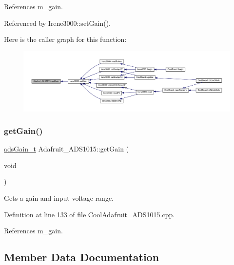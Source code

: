 References m\+\_\+gain.



Referenced by Irene3000\+::set\+Gain().

Here is the caller graph for this function\+:\nopagebreak
\begin{figure}[H]
\begin{center}
\leavevmode
\includegraphics[width=350pt]{df/df6/class_adafruit___a_d_s1015_a399441eace686975ff22937cbe45cc50_icgraph}
\end{center}
\end{figure}
\mbox{\label{class_adafruit___a_d_s1015_a6232d089aaa82226bc34623fdf92237c}} 
\subsubsection{\texorpdfstring{get\+Gain()}{getGain()}}
{\footnotesize\ttfamily \hyperlink{_cool_adafruit___a_d_s1015_8h_a3d6c0e15829a207b9155890811fa4781}{ads\+Gain\+\_\+t} Adafruit\+\_\+\+A\+D\+S1015\+::get\+Gain (\begin{DoxyParamCaption}\item[{void}]{ }\end{DoxyParamCaption})}



Gets a gain and input voltage range. 



Definition at line 133 of file Cool\+Adafruit\+\_\+\+A\+D\+S1015.\+cpp.



References m\+\_\+gain.



\subsection{Member Data Documentation}
\mbox{\label{class_adafruit___a_d_s1015_a2186993621a7973256d47f086c74035d}} 
